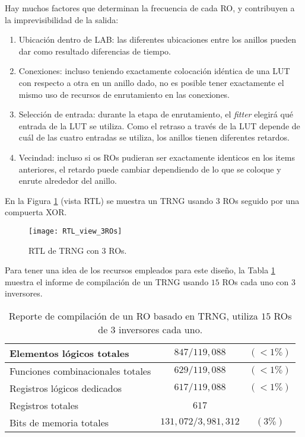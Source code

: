 Hay muchos factores que determinan la frecuencia de cada {RO}, y contribuyen a la imprevisibilidad de la salida:
\begin{enumerate}
\item Ubicación dentro de {LAB}: las diferentes ubicaciones entre los anillos pueden dar como resultado diferencias de tiempo.
\item Conexiones: incluso teniendo exactamente colocación idéntica de una {LUT} con respecto a otra en un anillo dado, no es posible tener exactamente el mismo {uso de recursos de enrutamiento} en las conexiones.
\item Selección de entrada: durante la etapa de enrutamiento, el \emph{fitter} elegirá qué entrada de la {LUT} se utiliza. Como el retraso a través de la {LUT} depende de cuál de las cuatro entradas se utiliza, los anillos tienen diferentes retardos.
\item Vecindad: incluso si os ROs pudieran ser exactamente identicos en los items anteriores, el retardo puede cambiar dependiendo de lo que se coloque y enrute alrededor del anillo.
\end{enumerate}


En la Figura \ref{fig:RTL3rings} (vista RTL) se muestra un {TRNG} usando $3$ {RO}s seguido por una compuerta XOR.
%
\begin{figure}
\begin{center}
\texttt{[image: RTL\_view\_3ROs]}
\caption{{RTL} de {TRNG} con $3$ {RO}s.}
\label{fig:RTL3rings}
\end{center}
\end{figure}

Para tener una idea de los recursos empleados para este diseño, la Tabla \ref{table:compilation} muestra el informe de compilación de un {TRNG} usando $15$ {RO}s cada uno con $3$ inversores.
\begin{table}
\begin{center}
\begin{tabular}{| l | c  c | }
	\hline
	\footnotesize{Elementos lógicos totales}         & $847/119,088$       & $( < 1 \%)$ \\ \hline
	\footnotesize{Funciones combinacionales totales} & $629/119,088$       & $( < 1 \%)$ \\ \hline
	\footnotesize{Registros lógicos dedicados}       & $617/119,088$       & $( < 1 \%)$ \\ \hline
	\footnotesize{Registros totales}                 & $617$               &             \\ \hline
	\footnotesize{Bits de memoria totales}           & $131,072/3,981,312$ & $( 3 \%)$   \\ \hline
\end{tabular}
\end{center}
\caption{Reporte de compilación de un {RO} basado en {TRNG}, utiliza $15$ {RO}s de $3$ inversores cada uno.}
\label{table:compilation}
\end{table}

